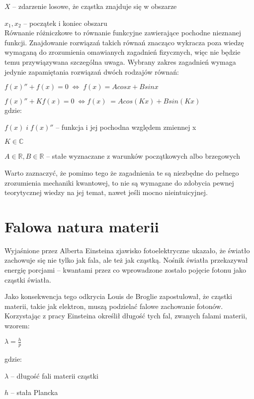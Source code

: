 \documentclass{SGGW-thesis}
\begin{document}
	$X$ -- zdarzenie losowe, że cząstka znajduje się w obszarze
	
	$x_1, x_2$ -- początek i koniec obszaru\\ 	
	
	Równanie różniczkowe to równanie funkcyjne zawierające pochodne nieznanej funkcji. Znajdowanie rozwiązań takich równań znacząco wykracza poza wiedzę wymaganą do zrozumienia omawianych zagadnień fizycznych, więc nie będzie temu przywiązywana szczególna uwaga. Wybrany zakres zagadnień wymaga jedynie zapamiętania rozwiązań dwóch rodzajów równań:
	
	$f(x)''+f(x)=0 \;\Longleftrightarrow\; f(x) = Acosx + Bsinx$
	
	$f(x)''+Kf(x)=0 \;\Longleftrightarrow f(x)\; = Acos(Kx) + Bsin(Kx)$ \\

	gdzie:
	
	$f(x) \; i \; f(x)''$ -- funkcja i jej pochodna względem zmiennej x

	$K \in \mathbb{C}$
		
	$A \in \mathbb{R}, B \in \mathbb{R}$ -- stałe wyznaczane z warunków początkowych albo brzegowych
	
	

	Warto zaznaczyć, że pomimo tego że zagadnienia te są niezbędne do pełnego zrozumienia mechaniki kwantowej, to nie są wymagane do zdobycia pewnej teorytycznej wiedzy na jej temat, nawet jeśli mocno nieintuicyjnej.
	\section{Falowa natura materii}
	Wyjaśnione przez Alberta Einsteina zjawisko fotoelektryczne ukazało, że światło zachowuje się nie tylko jak fala, ale też jak cząstką. Nośnik światła przekazywał energię porcjami -- kwantami przez co wprowadzone zostało pojęcie fotonu jako cząstki światła.
	
	 Jako konsekwencja tego odkrycia Louis de Broglie zapostulował, że cząstki materii, takie jak elektron, muszą podzielać falowe zachowanie fotonów. Korzystając z pracy Einsteina określił długość tych fal, zwanych falami materii, wzorem:
	 
	 \begin{center}
	 $\lambda=\frac{h}{p}$
	 \end{center}
	 
	 gdzie:
	 
	 $\lambda$ -- długość fali materii cząstki
	 
	 $h$ -- stała Plancka
	 
\end{document}
